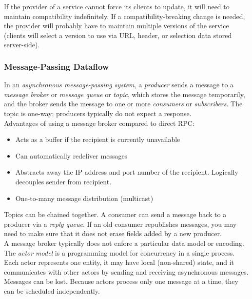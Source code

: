 \documentclass[12pt, titlepage]{article}
\begin{document}
If the provider of a service cannot force its clients to update, it will need to maintain compatibility indefinitely. If a compatibility-breaking change is needed, the provider will probably have to maintain multiple versions of the service (clients will select a version to use via URL, header, or selection data stored server-side).

\subsubsection{Message-Passing Dataflow}

In an \textit{asynchronous message-passing system}, a \textit{producer} sends a message to a \textit{message broker} or \textit{message queue} or \textit{topic}, which stores the message temporarily, and the broker sends the message to one or more \textit{consumers} or \textit{subscribers}. The topic is one-way; producers typically do not expect a response. \\

Advantages of using a message broker compared to direct RPC:
\begin{itemize}
    \item Acts as a buffer if the recipient is currently unavailable
    \item Can automatically redeliver messages
    \item Abstracts away the IP address and port number of the recipient. Logically decouples sender from recipient.
    \item One-to-many message distribution (multicast)
\end{itemize}

Topics can be chained together. A consumer can send a message back to a producer via a \textit{reply queue}. If an old consumer republishes messages, you may need to make sure that it does not erase fields added by a new producer. \\

A message broker typically does not enfore a particular data model or encoding. \\

The \textit{actor model} is a programming model for concurrency in a single process. Each actor represents one entity, it may have local (non-shared) state, and it communicates with other actors by sending and receiving asynchronous messages. Messages can be lost. Because actors process only one message at a time, they can be scheduled independently. \\
\end{document}
